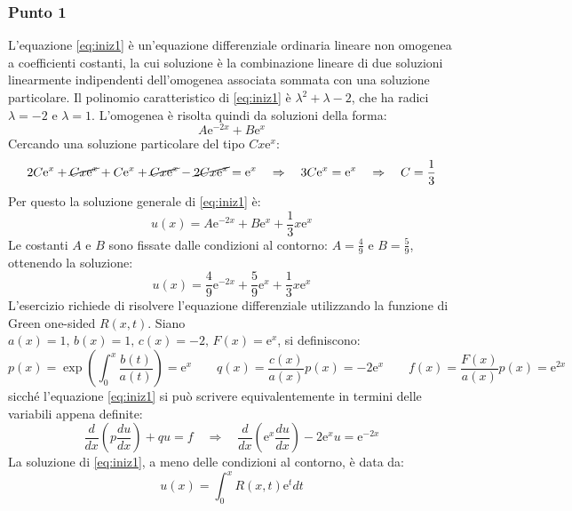 \documentclass[]{scrartcl}
\begin{document}
\subsubsection*{Punto 1}
L'equazione \eqref{eq:iniz1} è un'equazione differenziale ordinaria lineare non omogenea a coefficienti costanti, la cui soluzione è la combinazione lineare di due soluzioni linearmente indipendenti dell'omogenea associata sommata con una soluzione particolare. Il polinomio caratteristico di \eqref{eq:iniz1} è $ \lambda^2 + \lambda - 2 $, che ha radici $ \lambda = -2 $ e $ \lambda = 1 $. L'omogenea è risolta quindi da soluzioni della forma:
\[ A \mathrm{e}^{-2x}	+ B \mathrm{e}^{x} 	\]
Cercando una soluzione particolare del tipo $ Cx\mathrm{e}^x $:
\[2C\mathrm{e}^x + \cancel{Cx\mathrm{e}^x} + C\mathrm{e}^x + \cancel{Cx\mathrm{e}^x} - \cancel{2Cx\mathrm{e}^x} = \mathrm{e}^x \quad \Rightarrow \quad 3C\mathrm{e}^x =\mathrm{e}^x  \quad \Rightarrow \quad C=\frac{1}{3}  \]
Per questo la soluzione generale di \eqref{eq:iniz1} è:
\begin{equation}
u(x) = A \mathrm{e}^{-2x}	+ B \mathrm{e}^{x} + \frac{1}{3}x\mathrm{e}^x
\label{eq:soluz_generale_costanti_1}
\end{equation}
Le costanti $ A $ e $ B $ sono fissate dalle condizioni al contorno: $ A = \frac{4}{9} $ e $ B = \frac{5}{9} $, ottenendo la soluzione:
\begin{equation}
u(x) = \frac{4}{9} \mathrm{e}^{-2x}	+ \frac{5}{9} \mathrm{e}^{x} + \frac{1}{3}x\mathrm{e}^x
\label{eq:soluz_generale_costanti_completa_1}
\end{equation}
L'esercizio richiede di risolvere l'equazione differenziale utilizzando la funzione di Green one-sided $ R(x,t) $. Siano $ a(x) = 1,\, b(x) = 1,\, c(x)=-2,\, F(x) = \mathrm{e}^x $, si definiscono:
\[ p(x) = \exp\left( \int_0^x \frac{b(t)}{a(t)}	\right)	= \mathrm{e}^x \qquad q(x) = \frac{c(x)}{a(x)}p(x) = -2\mathrm{e}^x \qquad f(x) = \frac{F(x)}{a(x)}p(x) = \mathrm{e}^{2x} \]
sicché l'equazione \eqref{eq:iniz1} si può scrivere equivalentemente in termini delle variabili appena definite:
\begin{equation}
\frac{d}{dx}\left( p \frac{du}{dx}	\right) + qu = f \quad \Rightarrow \quad \frac{d}{dx}\left( \mathrm{e}^x \frac{du}{dx}	\right) -2\mathrm{e}^xu = \mathrm{e}^{-2x}
\label{eq:green_one_sided_equazione}
\end{equation} 
La soluzione di \eqref{eq:iniz1}, a meno delle condizioni al contorno, è data da:
\begin{equation}
u(x) = \int_0^x R(x,t) \mathrm{e}^t dt
\label{eq:soluz_generale_1}
\end{equation}
\end{document}
